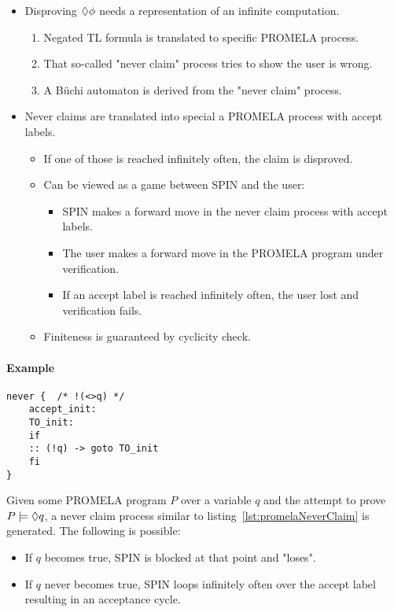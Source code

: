 				\begin{itemize}
					\item Disproving \( \lozenge \phi \) needs a representation of an infinite computation.
						\begin{enumerate}
							\item Negated TL formula is translated to specific PROMELA process.
							\item That so-called "never claim" process tries to show the user is wrong.
							\item A Büchi automaton is derived from the "never claim" process.
						\end{enumerate}
					\item Never claims are translated into special a PROMELA process with accept labels.
						\begin{itemize}
							\item If one of those is reached infinitely often, the claim is disproved.
							\item Can be viewed as a game between SPIN and the user:
								\begin{itemize}
									\item SPIN makes a forward move in the never claim process with accept labels.
									\item The user makes a forward move in the PROMELA program under verification.
									\item If an accept label is reached infinitely often, the user lost and verification fails.
								\end{itemize}
							\item Finiteness is guaranteed by cyclicity check.
						\end{itemize}
				\end{itemize}
			
				\paragraph{Example}
					\begin{lstlisting}[caption = { Never Claim PROMELA Process }, label = lst:promelaNeverClaim, language = PROMELA]
never {  /* !(<>q) */
	accept_init:
	TO_init:
	if
	:: (!q) -> goto TO_init
	fi
}
					\end{lstlisting}
				
					Given some PROMELA program \(P\) over a variable \(q\) and the attempt to prove \( P \models \lozenge q \), a never claim process similar to listing~\ref{lst:promelaNeverClaim} is generated. The following is possible:
					\begin{itemize}
						\item If \(q\) becomes true, SPIN is blocked at that point and "loses".
						\item If \(q\) never becomes true, SPIN loops infinitely often over the accept label resulting in an acceptance cycle.
					\end{itemize}
				
